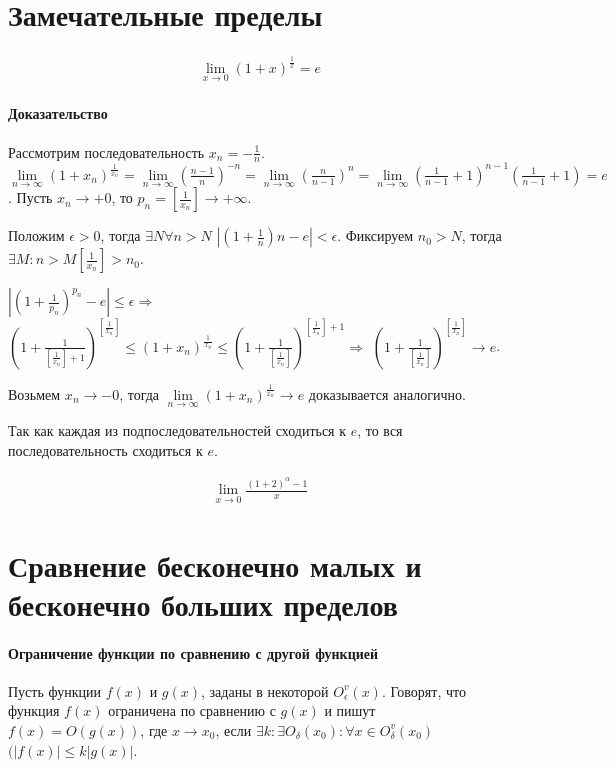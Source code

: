 \documentclass[10pt]{article}
\begin{document}
	\section{Замечательные пределы}
	\begin{eqnarray}
		\lim\limits_{x \to 0} (1+x)^\frac{1}{x} = e
	\end{eqnarray}
	\paragraph{Доказательство}
	Рассмотрим последовательность $x_n = -\frac{1}{n}$. $\lim\limits_{n \to \infty} (1+x_n)^\frac{1}{x_n} = \lim\limits_{n \to \infty} (\frac{n-1}{n})^{-n} = \lim\limits_{n \to \infty}(\frac{n}{n-1})^n = \lim\limits_{n \to \infty}(\frac{1}{n-1} +1)^{n-1}(\frac{1}{n-1}+1) = e$.
	Пусть $x_n \to +0$, то $p_n = [\frac{1}{x_n}] \to +\infty$.
	
	Положим $\epsilon > 0$, тогда $\exists N \forall n > N$ $|(1 + \frac{1}{n})n - e| < \epsilon$. Фиксируем $n_0 > N$, тогда $\exists M : n > M [\frac{1}{x_n}] > n_0$.
	
	$|(1 + \frac{1}{p_n})^{p_n} - e| \le \epsilon \Rightarrow$ 
	$(1 + \frac{1}{[\frac{1}{x_n}] + 1})^{[\frac{1}{x_n}]} \leq (1 + x_n)^\frac{1}{x_n} \leq (1 + \frac{1}{[\frac{1}{x_n}]})^{[\frac{1}{x_n}] + 1} \Rightarrow$
	$(1 + \frac{1}{[\frac{1}{x_n}]})^{[\frac{1}{x_n}]} \to e$.
	
	Возьмем $x_n \to -0$, тогда $\lim\limits_{n\to \infty}(1+x_n)^\frac{1}{x_n} \to e$ доказывается аналогично.
	
	Так как каждая из подпоследовательностей сходиться к $e$, то вся последовательность сходиться к $e$.
	
	\begin{eqnarray}
		\lim\limits_{x \to 0} \frac{(1+2)^\alpha - 1}{x}
	\end{eqnarray}
	
	\section{Сравнение бесконечно малых и бесконечно больших пределов}
	\paragraph{Ограничение функции по сравнению с другой функцией}
		Пусть функции $f(x)$ и $g(x)$, заданы в некоторой $O^v_\epsilon(x)$. Говорят, что функция $f(x)$ ограничена по сравнению с $g(x)$ и пишут $f(x) = O(g(x))$, где $x \to x_0$, если $\exists k : \exists O_\delta(x_0) : \forall x \in O^v_\delta(x_0)$ $(|f(x)| \leq k|g(x)|$.
\end{document}
